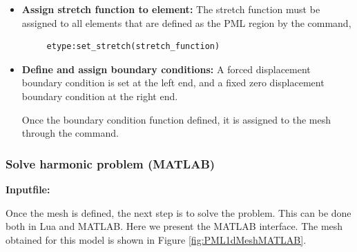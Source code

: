 \begin{itemize}
  \item{\textbf{Assign stretch function to element:}}
  The stretch function must be assigned to all elements that
  are defined as the PML region by the command,
  \begin{verbatim}
     etype:set_stretch(stretch_function)
  \end{verbatim}

  \item{\textbf{Define and assign boundary conditions:}}  
  A forced displacement boundary condition is set at the left end,
  and a fixed zero displacement boundary condition at the right end.

  Once the boundary condition function defined, it is assigned 
  to the mesh through the  command.

\end{itemize}

\clearpage
\subsubsection*{Solve harmonic problem (MATLAB)}
\begin{flushleft}
  \textbf{Inputfile:}
  \\
\end{flushleft}
\hspace{1in}
{\footnotesize
{}
}

\clearpage
Once the mesh is defined, the next step is to solve the problem.
This can be done both in Lua and MATLAB. Here we present the MATLAB
interface. 
The mesh obtained for this model is shown in 
Figure \ref{fig:PML1dMeshMATLAB}.


